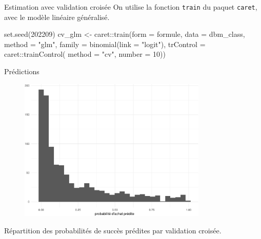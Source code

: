 \documentclass[
  ignorenonframetext,
]{beamer}
\newenvironment{Shaded}{\begin{snugshade}}{\end{snugshade}}
\newcommand{\AttributeTok}[1]{\textcolor[rgb]{0.40,0.45,0.13}{#1}}
\newcommand{\DecValTok}[1]{\textcolor[rgb]{0.68,0.00,0.00}{#1}}
\newcommand{\FunctionTok}[1]{\textcolor[rgb]{0.28,0.35,0.67}{#1}}
\newcommand{\NormalTok}[1]{\textcolor[rgb]{0.00,0.23,0.31}{#1}}
\newcommand{\OtherTok}[1]{\textcolor[rgb]{0.00,0.23,0.31}{#1}}
\newcommand{\SpecialCharTok}[1]{\textcolor[rgb]{0.37,0.37,0.37}{#1}}
\newcommand{\StringTok}[1]{\textcolor[rgb]{0.13,0.47,0.30}{#1}}
\begin{document}
\begin{frame}[fragile]{Estimation avec validation croisée}
\protect\hypertarget{estimation-avec-validation-croisuxe9e}{}
On utilise la fonction \texttt{train} du paquet \texttt{caret}, avec le
modèle linéaire généralisé.

\begin{Shaded}
\begin{Highlighting}[numbers=left,,]
\FunctionTok{set.seed}\NormalTok{(}\DecValTok{202209}\NormalTok{)}
\NormalTok{cv\_glm }\OtherTok{\textless{}{-}} 
\NormalTok{  caret}\SpecialCharTok{::}\FunctionTok{train}\NormalTok{(}\AttributeTok{form =}\NormalTok{ formule,}
             \AttributeTok{data =}\NormalTok{ dbm\_class,}
             \AttributeTok{method =} \StringTok{"glm"}\NormalTok{,}
             \AttributeTok{family =} \FunctionTok{binomial}\NormalTok{(}\AttributeTok{link =} \StringTok{"logit"}\NormalTok{),}
             \AttributeTok{trControl =}\NormalTok{ caret}\SpecialCharTok{::}\FunctionTok{trainControl}\NormalTok{(}
               \AttributeTok{method =} \StringTok{"cv"}\NormalTok{,}
               \AttributeTok{number =} \DecValTok{10}\NormalTok{))}
\end{Highlighting}
\end{Shaded}
\end{frame}

\begin{frame}{Prédictions}
\protect\hypertarget{pruxe9dictions}{}
\begin{figure}

{\centering \includegraphics[width=0.8\textwidth,height=\textheight]{MATH60602-diapos7_files/figure-beamer/figclassification0-1.pdf}

}

\end{figure}

\footnotesize

Répartition des probabilités de succès prédites par validation croisée.

\normalsize
\end{frame}
\end{document}
